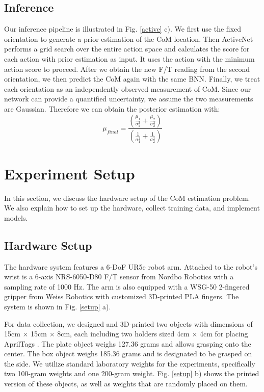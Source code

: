 \subsection{Inference}
Our inference pipeline is illustrated in Fig. \ref{active} c). We first use the fixed orientation to generate a prior estimation of the CoM location. Then ActiveNet performs a grid search over the entire action space and calculates the score for each action with prior estimation as input. It uses the action with the minimum action score to proceed. %
After we obtain the new F/T reading from the second orientation, we then predict the CoM again with the same BNN. Finally, we treat each orientation as an independently observed measurement of CoM. Since our network can provide a quantified uncertainty, we assume the two measurements are Gaussian. Therefore we can obtain the posterior estimation with: $$
\mu_{final} =\frac{ (\frac{\mu_1}{\sigma_1^2} + \frac{\mu_2}{\sigma_2^2})}{(\frac{1}{\sigma_1^2} + \frac{1}{\sigma_2^2})}$$

\section{Experiment Setup}

In this section, we discuss the hardware setup of the CoM estimation problem. We also explain how to set up the hardware, collect training data, and implement models.

\subsection{Hardware Setup}
\label{hardware}
The hardware system features a 6-DoF UR5e robot arm. Attached to the robot's wrist is a 6-axis NRS-6050-D80 F/T sensor from Nordbo Robotics with a sampling rate of 1000 Hz. The arm is also equipped with a WSG-50 2-fingered gripper from Weiss Robotics with customized 3D-printed PLA fingers. The system is shown in Fig. \ref{setup} a).

For data collection, we designed and 3D-printed two objects with dimensions of 15cm $\times$ 15cm $\times$ 8cm, each including two holders sized 4cm $\times$ 4cm for placing AprilTags \cite{olson2011tags}. The plate object weighs 127.36 grams and allows grasping onto the center. The box object weighs 185.36 grams and is designated to be grasped on the side. We utilize standard laboratory weights for the experiments, specifically two 100-gram weights and one 200-gram weight. Fig. \ref{setup} b) shows the printed version of these objects, as well as weights that are randomly placed on them. 

